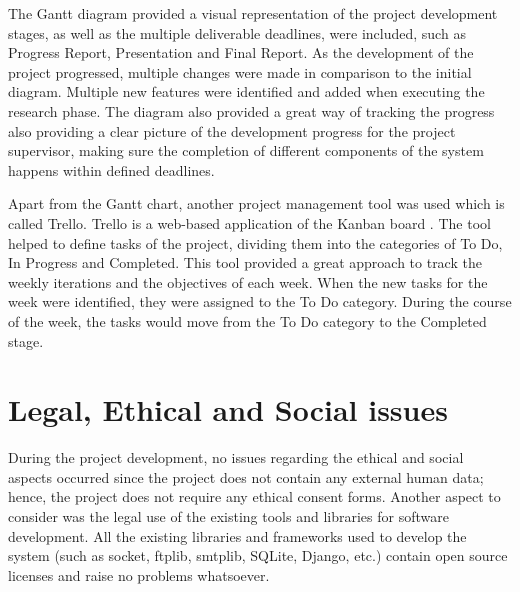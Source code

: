 \documentclass[10pt]{report}
\begin{document}
The Gantt diagram provided a visual representation of the project development stages, as well as the multiple deliverable deadlines, were included, such as Progress Report, Presentation and Final Report. As the development of the project progressed, multiple changes were made in comparison to the initial diagram. Multiple new features were identified and added when executing the research phase. The diagram also provided a great way of tracking the progress also providing a clear picture of the development progress for the project supervisor, making sure the completion of different components of the system happens within defined deadlines.
\newline

Apart from the Gantt chart, another project management tool was used which is called Trello. Trello is a web-based application of the Kanban board \cite{trello}. The tool helped to define tasks of the project, dividing them into the categories of To Do, In Progress and Completed. This tool provided a great approach to track the weekly iterations and the objectives of each week. When the new tasks for the week were identified, they were assigned to the To Do category. During the course of the week, the tasks would move from the To Do category to the Completed stage.

\section{Legal, Ethical and Social issues}

During the project development, no issues regarding the ethical and social aspects occurred since the project does not contain any external human data; hence, the project does not require any ethical consent forms. Another aspect to consider was the legal use of the existing tools and libraries for software development. All the existing libraries and frameworks used to develop the system (such as socket, ftplib, smtplib, SQLite, Django, etc.) contain open source licenses and raise no problems whatsoever.


\end{document}
